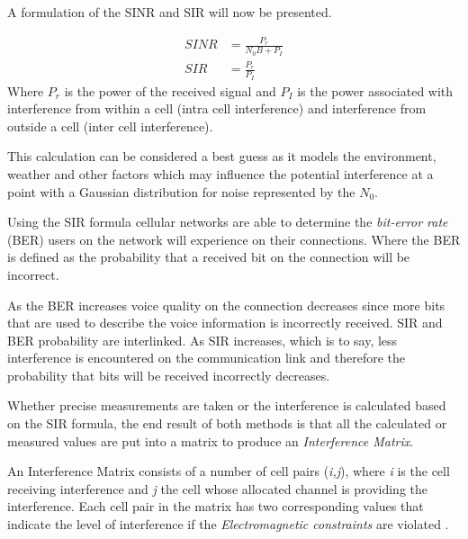 A formulation of the SINR and SIR will now be presented.

\begin{align}
	SINR &= \frac{P_r}{N_0B + P_I}\\
	SIR &= \frac{P_r}{P_I}
\end{align}
Where $P_r$ is the power of the received signal and $P_I$ is the power associated with interference from within a cell (intra cell interference) and interference from outside a cell (inter cell interference)\cite{WirelessCommunications}.

This calculation can be considered a best guess as it models the environment, weather and other factors which may influence the potential interference at a point with a Gaussian distribution for noise represented by the $N_0$\cite{Karen2004,WirelessCommunications}. 

Using the SIR formula cellular networks are able to determine the \emph{bit-error rate} (BER) users on the network will experience on their connections\cite{WirelessCommunications,WirelessDigitalCommunications}. Where the BER is defined as the probability that a received bit on the connection will be incorrect\cite{WirelessDigitalCommunications,WirelessCommunications,MobileWirelessCommunications}. 

As the BER increases voice quality on the connection decreases since more bits that are used to describe the voice information is incorrectly received. SIR and BER probability are interlinked. As SIR increases, which is to say, less interference is encountered on the communication link and therefore the probability that bits will be received incorrectly decreases\cite{WirelessDigitalCommunications,WirelessCommunications,MobileWirelessCommunications}.

Whether precise measurements are taken or the interference is calculated based on the SIR formula, the end result of both methods is that all the calculated or measured values are put into a matrix to produce an \emph{Interference Matrix}\cite{ACOvsEA}.

An Interference Matrix consists of a number of cell pairs (\emph{i,j}), where \emph{i} is the cell receiving interference and \emph{j} the cell whose allocated channel is providing the interference. Each cell pair in the matrix has two corresponding values that indicate the level of interference if the \emph{Electromagnetic constraints} are violated \cite{Eisenblatter,Karen2004,ACOvsEA,AndreasPaper}. 

